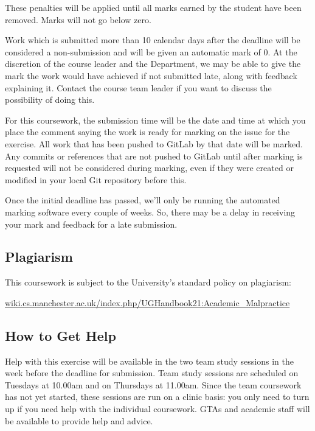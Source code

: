 \documentclass[
]{book}
\begin{document}
These penalties will be applied until all marks earned by the student have been removed. Marks will not go below zero.

Work which is submitted more than 10 calendar days after the deadline will be considered a non-submission and will be given an automatic mark of 0. At the discretion of the course leader and the Department, we may be able to give the mark the work would have achieved if not submitted late, along with feedback explaining it. Contact the course team leader if you want to discuss the possibility of doing this.

For this coursework, the submission time will be the date and time at which you place the comment saying the work is ready for marking on the issue for the exercise. All work that has been pushed to GitLab by that date will be marked. Any commits or references that are not pushed to GitLab until after marking is requested will not be considered during marking, even if they were created or modified in your local Git repository before this.

Once the initial deadline has passed, we'll only be running the automated marking software every couple of weeks. So, there may be a delay in receiving your mark and feedback for a late submission.

\hypertarget{plagiarism}{%
\subsection{Plagiarism}\label{plagiarism}}

This coursework is subject to the University's standard policy on plagiarism:

\href{https://wiki.cs.manchester.ac.uk/index.php/UGHandbook21:Academic_Malpractice}{wiki.cs.manchester.ac.uk/index.php/UGHandbook21:Academic\_Malpractice}

\hypertarget{help}{%
\subsection{How to Get Help}\label{help}}

Help with this exercise will be available in the two team study sessions in the week before the deadline for submission. Team study sessions are scheduled on Tuesdays at 10.00am and on Thursdays at 11.00am. Since the team coursework has not yet started, these sessions are run on a clinic basis: you only need to turn up if you need help with the individual coursework. GTAs and academic staff will be available to provide help and advice.
\end{document}
